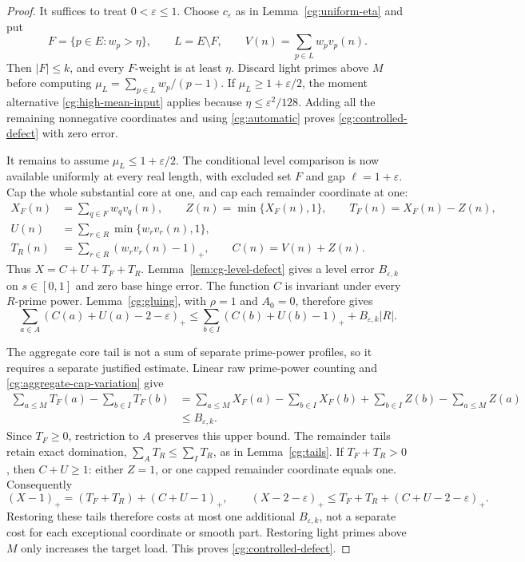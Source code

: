 \begin{proof}
It suffices to treat \(0<\varepsilon\le1\). Choose
\(c_\varepsilon\) as in Lemma~\ref{cg:uniform-eta} and put
\[
 F=\{p\in E:w_p>\eta\},\qquad L=E\setminus F,\qquad
 V(n)=\sum_{p\in L}w_pv_p(n).
\]
Then \(|F|\le k\), and every \(F\)-weight is at least \(\eta\).
Discard light primes above \(M\) before computing
\(\mu_L=\sum_{p\in L}w_p/(p-1)\). If
\(\mu_L\ge1+\varepsilon/2\), the moment alternative
\eqref{cg:high-mean-input} applies because
\(\eta\le\varepsilon^2/128\). Adding all the remaining
nonnegative coordinates and using \eqref{cg:automatic} proves
\eqref{cg:controlled-defect} with zero error.

It remains to assume \(\mu_L\le1+\varepsilon/2\). The conditional
level comparison is now available uniformly at every real length,
with excluded set \(F\) and gap \(\ell=1+\varepsilon\).
Cap the whole substantial core at one, and cap each remainder
coordinate at one:
\[
 \begin{split}
 X_F(n)&=\sum_{q\in F}w_qv_q(n),\qquad
 Z(n)=\min\{X_F(n),1\},\qquad T_F(n)=X_F(n)-Z(n),\\
 U(n)&=\sum_{r\in R}\min\{w_rv_r(n),1\},\\
 T_R(n)&=\sum_{r\in R}(w_rv_r(n)-1)_+,\qquad
 C(n)=V(n)+Z(n).
 \end{split}
\]
Thus \(X=C+U+T_F+T_R\). Lemma~\ref{lem:cg-level-defect}
gives a level error \(B_{\varepsilon,k}\) on \(s\in[0,1]\)
and zero base hinge error. The function \(C\) is
invariant under every \(R\)-prime power. Lemma~\ref{cg:gluing},
with \(\rho=1\) and \(A_0=0\), therefore gives
\[
 \sum_{a\in A}(C(a)+U(a)-2-\varepsilon)_+
 \le\sum_{b\in I}(C(b)+U(b)-1)_+
       +B_{\varepsilon,k}|R|.
\]

The aggregate core tail is not a sum of separate prime-power
profiles, so it requires a separate justified estimate. Linear raw
prime-power counting and \eqref{cg:aggregate-cap-variation} give
\begin{equation}
 \begin{split}
 \sum_{a\le M}T_F(a)-\sum_{b\in I}T_F(b)
 &=\sum_{a\le M}X_F(a)-\sum_{b\in I}X_F(b)
       +\sum_{b\in I}Z(b)-\sum_{a\le M}Z(a)\\
 &\le B_{\varepsilon,k}.
 \end{split}
 \label{cg:aggregate-tail}
\end{equation}
Since \(T_F\ge0\), restriction to \(A\) preserves this upper
bound. The remainder tails retain exact domination,
\(\sum_A T_R\le\sum_I T_R\), as in Lemma~\ref{cg:tails}.
If \(T_F+T_R>0\), then \(C+U\ge1\): either \(Z=1\), or
one capped remainder coordinate equals one. Consequently
\[
 (X-1)_+=(T_F+T_R)+(C+U-1)_+,
 \qquad
 (X-2-\varepsilon)_+
 \le T_F+T_R+(C+U-2-\varepsilon)_+.
\]
Restoring these tails therefore costs at most one additional
\(B_{\varepsilon,k}\), not a separate cost for each exceptional
coordinate or smooth part. Restoring light primes above \(M\)
only increases the target load. This proves
\eqref{cg:controlled-defect}.


\end{proof}
